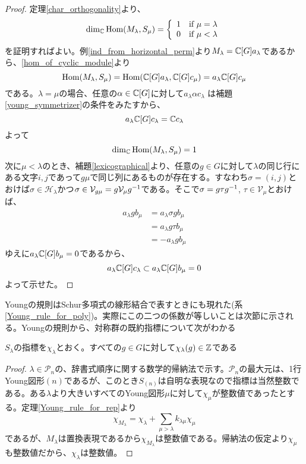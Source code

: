 \documentclass{ltjsreport}
\begin{document}
\begin{proof}
  定理\ref{char_orthogonality}より、
  \[
  \dim_{\mathbb{C}}\text{Hom}(M_\lambda,S_\mu)=
  \left\{\begin{array}{cc}
    1 & \text{if $\mu=\lambda$}\\
    0 & \text{if $\mu<\lambda$}
  \end{array}\right.  
  \]
  を証明すればよい。例\ref{ind_from_horizontal_perm}より$M_\lambda=\mathbb{C}[G]a_\lambda$であるから、\ref{hom_of_cyclic_module}より
  \[
  \text{Hom}(M_\lambda,S_\mu)=\text{Hom}(\mathbb{C}[G]a_\lambda,\mathbb{C}[G]c_\mu)=a_\lambda\mathbb{C}[G]c_\mu 
  \]
  である。$\lambda=\mu$の場合、任意の$\alpha\in\mathbb{C}[G]$に対して$a_\lambda\alpha c_\lambda$ は補題\ref{young_symmetrizer}の条件をみたすから、
  \[
  a_\lambda\mathbb{C}[G]c_\lambda=\mathbb{C} c_\lambda
  \]
  よって
  \[
  \dim_{\mathbb{C}}\text{Hom}(M_\lambda,S_\mu)=1  
  \]
  次に$\mu<\lambda$のとき、補題\ref{lexicographical}より、任意の$g\in G$に対して$\lambda$の同じ行にある文字$i,j$であって$g\mu$で同じ列にあるものが存在する。すなわち$\sigma=(i,j)$とおけば$\sigma\in \mathcal{H}_\lambda$かつ$\sigma\in\mathcal{V}_{g\mu}=g\mathcal{V}_{\mu}g^{-1}$である。そこで$\sigma=g\tau g^{-1}$, $\tau\in\mathcal{V}_\mu$とおけば、
  \begin{align*}
    a_\lambda g b_\mu
    &=a_\lambda\sigma g b_\mu\\
    &=a_\lambda g\tau b_\mu\\
    &=-a_\lambda g b_\mu
  \end{align*}
  ゆえに$a_\lambda\mathbb{C}[G]b_\mu=0$であるから、
  \[
  a_\lambda\mathbb{C}[G]c_\lambda\subset a_\lambda\mathbb{C}[G]b_\mu=0
  \]
  よって示せた。
\end{proof}

Youngの規則はSchur多項式の線形結合で表すときにも現れた(系\ref{Young_rule_for_poly})。実際にこの二つの係数が等しいことは次節に示される。Youngの規則から、対称群の既約指標について次がわかる

\begin{cor}\label{char_integrity}
  $S_\lambda$の指標を$\chi_{\lambda}$とおく。すべての$g\in G$に対して$\chi_\lambda(g)\in\mathbb{Z}$である
\end{cor}

\begin{proof}
  $\lambda\in\mathcal{P}_n$の、辞書式順序に関する数学的帰納法で示す。$\mathcal{P}_n$の最大元は、1行Young図形$(n)$であるが、このとき$S_{(n)}$は自明な表現なので指標は当然整数である。ある$\lambda$より大きいすべてのYoung図形$\mu$に対して$\chi_\mu$が整数値であったとする。定理\ref{Young_rule_for_rep}より
  \[
  \chi_{M_\lambda}  =\chi_{\lambda}+\sum_{\mu>\lambda}k_{\lambda\mu}\chi_\mu
  \]
  であるが、$M_\lambda$は置換表現であるから$\chi_{M_\lambda}$は整数値である。帰納法の仮定より$\chi_\mu$も整数値だから、$\chi_\lambda$は整数値。
\end{proof}
\end{document}
